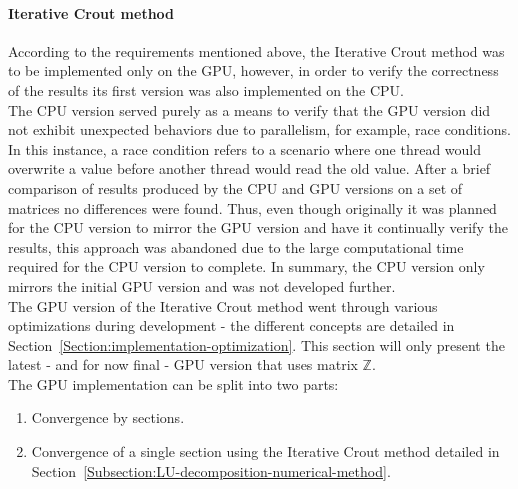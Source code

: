 \paragraph{Iterative Crout method}\label{Paragraph:implementation-decomposition-project-lu-decomposition-iterative-crout-method}
According to the requirements mentioned above, the Iterative Crout method was to be implemented only on the GPU, however, in order to verify the correctness of the results its first version was also implemented on the CPU. \\
The CPU version served purely as a means to verify that the GPU version did not exhibit unexpected behaviors due to parallelism, for example, race conditions. In this instance, a race condition refers to a scenario where one thread would overwrite a value before another thread would read the old value. After a brief comparison of results produced by the CPU and GPU versions on a set of matrices no differences were found. Thus, even though originally it was planned for the CPU version to mirror the GPU version and have it continually verify the results, this approach was abandoned due to the large computational time required for the CPU version to complete. In summary, the CPU version only mirrors the initial GPU version and was not developed further. \\
The GPU version of the Iterative Crout method went through various optimizations during development - the different concepts are detailed in Section~\ref{Section:implementation-optimization}. This section will only present the latest - and for now final - GPU version that uses matrix $ \mathbb{Z} $. \\
The GPU implementation can be split into two parts:

\begin{enumerate}
	\item Convergence by sections.
	\item Convergence of a single section using the Iterative Crout method detailed in Section~\ref{Subsection:LU-decomposition-numerical-method}.
\end{enumerate}

